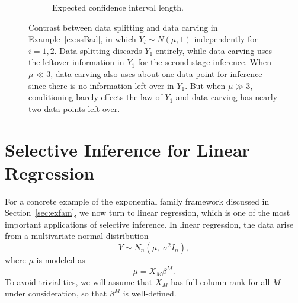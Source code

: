 \documentclass{article}
\theoremstyle{definition}
\newcommand{\bX}{X}
\newcommand{\sampOrData}{data }
\newcommand{\capSampOrData}{Data }
\begin{document}
\begin{figure}
\begin{subfigure}[t]{.4\textwidth}
    \caption{Expected confidence interval length.}
    \label{fig:ssBad:ci}
  \end{subfigure}
  \caption{Contrast between \sampOrData splitting and \sampOrData carving in Example~\ref{ex:ssBad}, in which $Y_{i}\sim N(\mu,1)$ independently for $i=1,2$. \capSampOrData splitting
discards $Y_{1}$ entirely, while \sampOrData carving uses the leftover information in $Y_{1}$ for the second-stage inference. When $\mu\ll 3$, \sampOrData carving also uses about one data point for inference since there is no information left over in $Y_{1}$. But when $\mu\gg 3$, conditioning barely effects the law of $Y_{1}$ and \sampOrData carving has nearly two data points left over.}
  \label{fig:ssBad}
\end{figure}




\section{Selective Inference for Linear Regression}\label{sec:linReg}

For a concrete example of the exponential family framework discussed in Section~\ref{sec:exfam}, we now turn to linear regression, which is one of the most important applications of selective inference. In linear regression, the data arise from a multivariate normal distribution
\begin{equation}\label{eq:satModel}
  Y \sim N_n(\mu, \;\sigma^2 I_n),
\end{equation}
where $\mu$ is modeled as
\begin{equation}\label{eq:subModel}
  \mu = \bX_M \beta^{M}.
\end{equation}
To avoid trivialities, we will assume that $\bX_M$ has full column rank for all $M$ under consideration, so that $\beta^{M}$ is well-defined. 
\end{document}
